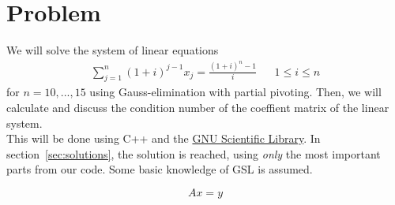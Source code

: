 \documentclass[11pt, a4paper, titlepage, openright]{article}
\begin{document}

\tableofcontents
\newpage

\section{Problem}
    We will solve the system of linear equations
        \[
            \begin{aligned}
                \sum_{j=1}^{n} (1+i)^{j-1} x_j = \frac{(1+i)^{n} - 1}{i}     && 1 \le i \le n
            \end{aligned}
        \]
    for \( n = 10, ..., 15 \) using Gauss-elimination with partial pivoting.
    Then, we will calculate and discuss the condition number of the coeffient matrix of the linear system. \\
    This will be done using C++ and the \href{http://www.gnu.org/software/gsl/}{GNU Scientific Library}.
    In section~\ref{sec:solutions}, the solution is reached, using \emph{only} the
    most important parts from our code. Some basic knowledge of GSL is assumed.

    \[Ax = y\]
\end{document}
